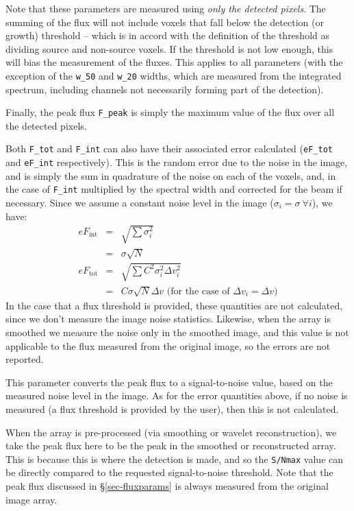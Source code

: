 Note that these parameters are measured using \textit{only the
  detected pixels}. The summing of the flux will not include voxels
that fall below the detection (or growth) threshold -- which is in
accord with the definition of the threshold as dividing source and
non-source voxels. If the threshold is not low enough, this will bias
the measurement of the fluxes. This applies to all parameters (with
the exception of the \texttt{w\_50} and \texttt{w\_20} widths, which
are measured from the integrated spectrum, including channels not
necessarily forming part of the detection).

Finally, the peak flux \texttt{F\_peak} is simply the maximum value of
the flux over all the detected pixels.



Both \texttt{F\_tot} and \texttt{F\_int} can also have their
associated error calculated (\texttt{eF\_tot} and \texttt{eF\_int}
respectively). This is the random error due to the noise in the image,
and is simply the sum in quadrature of the noise on each of the
voxels, and, in the case of \texttt{F\_int} multiplied by the spectral
width and corrected for the beam if necessary. Since we assume a
constant noise level in the image ($\sigma_i=\sigma\  \forall i$), we
have:
\begin{eqnarray*}
eF_\text{int} &= & \sqrt{\sum\sigma_i^2} \\&= &\sigma \sqrt{N}\\
eF_\text{tot} &= & \sqrt{\sum C^2\sigma_i^2 \Delta v_i^2} \\&= &C \sigma
\sqrt{N} \Delta v \text{ (for the case of $\Delta v_i = \Delta v$)}
\end{eqnarray*}
In the case that a flux threshold is provided, these quantities are
not calculated, since we don't measure the image noise
statistics. Likewise, when the array is smoothed we measure the noise
only in the smoothed image, and this value is not applicable to the
flux measured from the original image, so the errors are not
reported. 



This parameter converts the peak flux to a signal-to-noise value,
based on the measured noise level in the image. As for the error
quantities above, if no noise is measured (\ie a flux threshold is
provided by the user), then this is not calculated.

When the array is pre-processed (via smoothing or wavelet
reconstruction), we take the peak flux here to be the peak in the
smoothed or reconstructed array. This is because this is where the
detection is made, and so the \texttt{S/Nmax} value can be directly
compared to the requested signal-to-noise threshold. Note that the
peak flux discussed in \S\ref{sec-fluxparams} is always measured from
the original image array.

